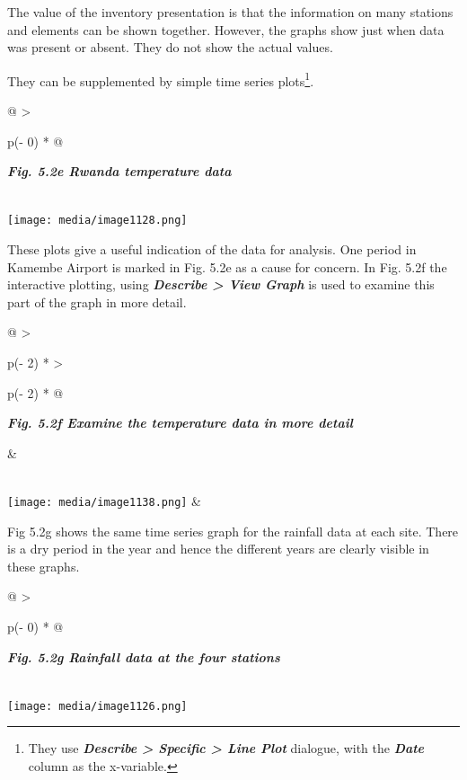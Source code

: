 \documentclass[
  letterpaper,
  DIV=11,
  numbers=noendperiod]{scrreprt}
\begin{document}
The value of the inventory presentation is that the information on many
stations and elements can be shown together. However, the graphs show
just when data was present or absent. They do not show the actual
values.

They can be supplemented by simple time series plots\footnote{They use
  \textbf{\emph{Describe \textgreater{} Specific \textgreater{} Line
  Plot}} dialogue, with the \textbf{\emph{Date}} column as the
  x-variable.}.

\begin{longtable}[]{@{}
  >{\raggedright\arraybackslash}p{(\columnwidth - 0\tabcolsep) * }@{}}
\toprule\noalign{}
\begin{minipage}[b]{\linewidth}\raggedright
\textbf{\emph{Fig. 5.2e Rwanda temperature data}}
\end{minipage} \\
\midrule\noalign{}
\endhead
\bottomrule\noalign{}
\endlastfoot
\texttt{[image: media/image1128.png]} \\
\end{longtable}

These plots give a useful indication of the data for analysis. One
period in Kamembe Airport is marked in Fig. 5.2e as a cause for concern.
In Fig. 5.2f the interactive plotting, using \textbf{\emph{Describe
\textgreater{} View Graph}} is used to examine this part of the graph in
more detail.

\begin{longtable}[]{@{}
  >{\raggedright\arraybackslash}p{(\columnwidth - 2\tabcolsep) * }
  >{\raggedright\arraybackslash}p{(\columnwidth - 2\tabcolsep) * }@{}}
\toprule\noalign{}
\begin{minipage}[b]{\linewidth}\raggedright
\textbf{\emph{Fig. 5.2f Examine the temperature data in more detail}}
\end{minipage} & \begin{minipage}[b]{\linewidth}\raggedright
\end{minipage} \\
\midrule\noalign{}
\endhead
\bottomrule\noalign{}
\endlastfoot
\texttt{[image: media/image1138.png]}
& \\
\end{longtable}

Fig 5.2g shows the same time series graph for the rainfall data at each
site. There is a dry period in the year and hence the different years
are clearly visible in these graphs.

\begin{longtable}[]{@{}
  >{\raggedright\arraybackslash}p{(\columnwidth - 0\tabcolsep) * }@{}}
\toprule\noalign{}
\begin{minipage}[b]{\linewidth}\raggedright
\textbf{\emph{Fig. 5.2g Rainfall data at the four stations}}
\end{minipage} \\
\midrule\noalign{}
\endhead
\bottomrule\noalign{}
\endlastfoot
\texttt{[image: media/image1126.png]} \\
\end{longtable}
\end{document}
